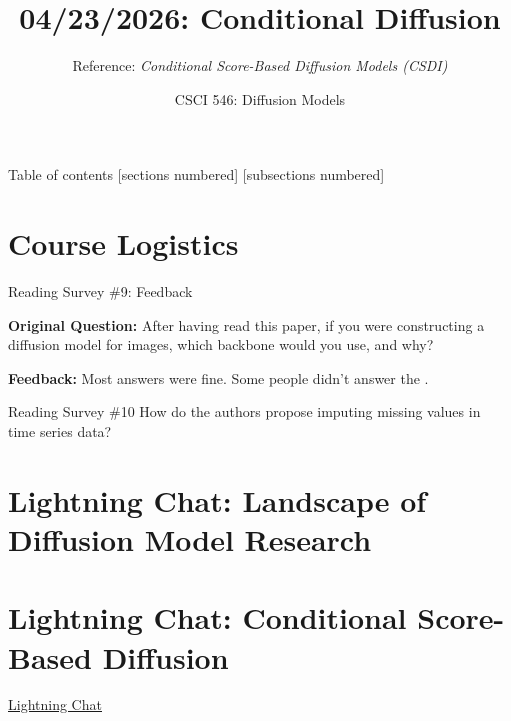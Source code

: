 \documentclass[10pt]{beamer}
\title{04/23/2026: Conditional Diffusion}
\author{Reference: \textit{Conditional Score-Based Diffusion Models (CSDI)}}
\date{CSCI 546: Diffusion Models}
\begin{document}
\maketitle


\begin{frame}{Table of contents}
  [sections numbered]
  [subsections numbered]
  \tableofcontents
\end{frame}





\section{Course Logistics}




\begin{frame}{Reading Survey \#9: Feedback}

\textbf{Original Question:} After having read this paper, if you were constructing a diffusion model for images, which backbone would you use, and why?

\vfill 

\textbf{Feedback:} Most answers were fine.  Some people didn't answer the .

\end{frame}


\begin{frame}{Reading Survey \#10}
How do the authors propose imputing missing values in time series data?
\end{frame}




\section{Lightning Chat: Landscape of Diffusion Model Research}




\section{Lightning Chat: Conditional Score-Based Diffusion}

\begin{frame}[standout]
\href{https://docs.google.com/presentation/d/1i_iHb4rMHTgZkleerdyryA8Hdn3mvqSSLZQNyTmujlg/edit?slide=id.g3e03092e772_0_27\#slide=id.g3e03092e772_0_27}{\underline{Lightning Chat}} 
\end{frame}
\end{document}
